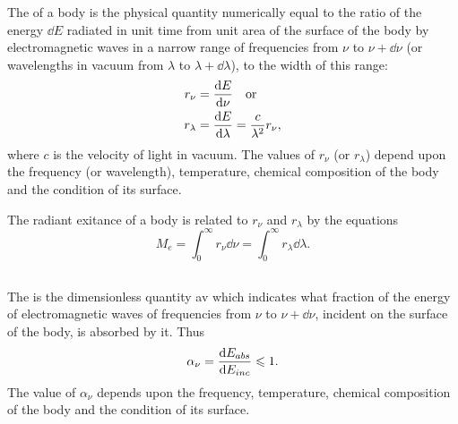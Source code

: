 The  of a body is the physical quantity numerically equal to the ratio of the energy $\dd E$ radiated in unit time from unit area of the surface of the body by electromagnetic waves in a narrow range of frequencies from $\nu$ to $\nu + \dd \nu$ (or wavelengths in vacuum from $\lambda$ to $\lambda + \dd \lambda$), to the width of this range:
\begin{align*}%
r_{\nu} & = \dv{E}{\nu} \qor \\
r_{\lambda} & = \dv{E}{\lambda} = \frac{c}{\lambda^{2}} r_{\nu},
\end{align*}
where $c$ is the velocity of light in vacuum. The values of $r_{\nu}$ (or $r_{\lambda}$) depend upon the frequency (or wavelength), temperature, chemical composition of the body and the condition of its surface.

The radiant exitance of a body is related to $r_{\nu}$ and $r_{\lambda}$ by the equations
\begin{equation*}%
M_{e} = \int_{0}^{\infty} r_{\nu} \dd \nu = \int_{0}^{\infty} r_{\lambda} \dd \lambda .
\end{equation*}

\subsection{}\label{36.1.5} The  is the dimensionless quantity av which indicates what fraction of the energy of electromagnetic waves of frequencies from $\nu$ to $\nu + \dd \nu$, incident on the surface of the body, is absorbed by it. Thus
\begin{equation*}%
\alpha_{\nu} = \dv{E_{abs}}{E_{inc}} \leqslant 1. 
\end{equation*}
The value of $\alpha_{\nu}$ depends upon the frequency, temperature, chemical composition of the body and the condition of its surface.

